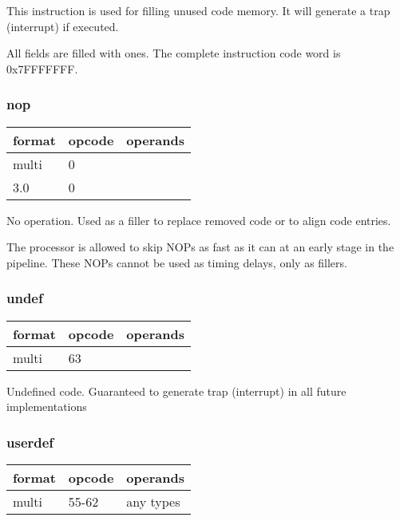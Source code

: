 \documentclass[forwardcom.tex]{subfiles}
\begin{document}
This instruction is used for filling unused code memory. It will generate a trap (interrupt) if executed.
\vspace{2mm}

All fields are filled with ones. The complete instruction code word is 0x7FFFFFFF.

\subsubsection{nop}
\label{table:nopInstruction}
\begin{tabular}{|p{12mm}|p{12mm}|p{110mm}|}
\hline
\bfseries format & \bfseries opcode & \bfseries operands \\ \hline
multi &  0 & \\ \hline
3.0   &  0 & \\ \hline
\end{tabular}
\vspace{2mm}

No operation. Used as a filler to replace removed code or to align code entries.
\vspace{2mm}

The processor is allowed to skip NOPs as fast as it can at an early stage in the pipeline. These NOPs cannot be used as timing delays, only as fillers.
\vspace{2mm}


\subsubsection{undef}
\label{table:undefInstruction}
\begin{tabular}{|p{12mm}|p{12mm}|p{110mm}|}
\hline
\bfseries format & \bfseries opcode & \bfseries operands \\ \hline
multi & 63 & \\ \hline
\end{tabular}
\vspace{2mm}

Undefined code. Guaranteed to generate trap (interrupt) in all future implementations

\subsubsection{userdef}
\label{table:userdefInstruction}
\begin{tabular}{|p{12mm}|p{12mm}|p{110mm}|}
\hline
\bfseries format & \bfseries opcode & \bfseries operands \\ \hline
multi & 55-62 & any types \\ \hline
\end{tabular}
\vspace{2mm}
\end{document}
